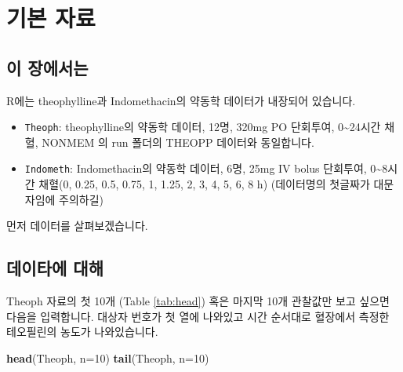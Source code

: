 \documentclass[12pt,]{krantz}
\newenvironment{Shaded}{\begin{snugshade}}{\end{snugshade}}
\newcommand{\KeywordTok}[1]{\textcolor[rgb]{0.13,0.29,0.53}{\textbf{#1}}}
\newcommand{\DataTypeTok}[1]{\textcolor[rgb]{0.13,0.29,0.53}{#1}}
\newcommand{\DecValTok}[1]{\textcolor[rgb]{0.00,0.00,0.81}{#1}}
\newcommand{\NormalTok}[1]{#1}
\providecommand{\tightlist}{%
  \setlength{\itemsep}{0pt}\setlength{\parskip}{0pt}}
\theoremstyle{definition}
\theoremstyle{definition}
\theoremstyle{definition}
\theoremstyle{remark}
\begin{document}
\chapter{기본 자료}\label{datasets}

\section{이 장에서는}\label{introdatasets}

R에는 theophylline과 Indomethacin의 약동학 데이터가 내장되어 있습니다.

\begin{itemize}
\tightlist
\item
  \texttt{Theoph}: theophylline의 약동학 데이터, 12명, 320mg PO
  단회투여, 0\textasciitilde{}24시간 채혈, NONMEM 의 run 폴더의 THEOPP
  데이터와 동일합니다.
\item
  \texttt{Indometh}: Indomethacin의 약동학 데이터, 6명, 25mg IV bolus
  단회투여, 0\textasciitilde{}8시간 채혈(0, 0.25, 0.5, 0.75, 1, 1.25, 2,
  3, 4, 5, 6, 8 h) (데이터명의 첫글짜가 대문자임에 주의하길)
\end{itemize}

먼저 데이터를 살펴보겠습니다.

\section{데이타에 대해}\label{TheophData}

Theoph 자료의 첫 10개 (Table \ref{tab:head}) 혹은 마지막 10개 관찰값만
보고 싶으면 다음을 입력합니다. 대상자 번호가 첫 열에 나와있고 시간
순서대로 혈장에서 측정한 테오필린의 농도가 나와있습니다.

\begin{Shaded}
\begin{Highlighting}[]
\KeywordTok{head}\NormalTok{(Theoph, }\DataTypeTok{n=}\DecValTok{10}\NormalTok{)}
\KeywordTok{tail}\NormalTok{(Theoph, }\DataTypeTok{n=}\DecValTok{10}\NormalTok{)}
\end{Highlighting}
\end{Shaded}
\end{document}
